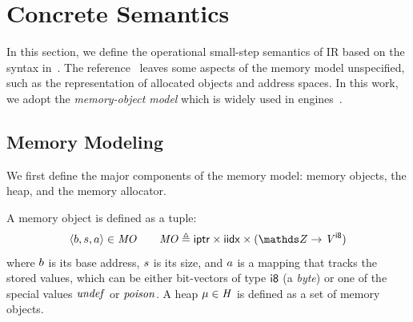 \section{Concrete Semantics}
\label{sec:concrete-semantics}



In this section, we define the operational small-step semantics of \llvm IR based on the syntax in~.
The \llvm reference~\cite{llvmref} leaves some aspects of the memory model unspecified,
such as the representation of allocated objects and address spaces.
In this work,
we adopt the \emph{memory-object model} which is widely used in \SE engines~\cite{klee,mossberg2019manticore}.

\subsection{Memory Modeling}
\label{sec:memory-modeling}

We first define the major components of the memory model: memory objects, the heap, and the memory allocator.

\begin{definition}
\label{def:memory}
A memory object is defined as a tuple:
\[ \mobj{\addr}{\size}{\arrayvalue} \in \MemoryObjects \quad \quad \MemoryObjects \triangleq \pointertype \times \indextype \times (\Z \rightarrow \Vals^{\bvsort{8}}) \]
where $b$ is its base address, $s$ is its size, and $a$ is a mapping that tracks the stored values,
which can be either bit-vectors of type $\textsf{i8}$ (\ie a \emph{byte}) or one of the special values $\mathit{undef}$ or $\mathit{poison}$.
A heap $\mathit{\mu} \in \mathit{H}$ is defined as a set of memory objects.
\end{definition}


